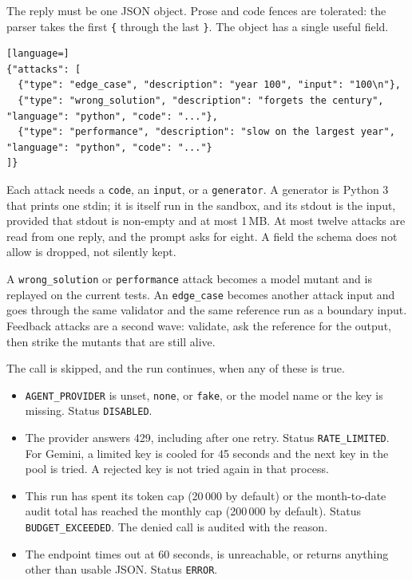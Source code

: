 \documentclass[10pt,a4paper]{article}
\begin{document}
The reply must be one JSON object. Prose and code fences are tolerated: the parser takes the first \texttt{\{} through the last \texttt{\}}. The object has a single useful field.

\begin{lstlisting}[language=]
{"attacks": [
  {"type": "edge_case", "description": "year 100", "input": "100\n"},
  {"type": "wrong_solution", "description": "forgets the century", "language": "python", "code": "..."},
  {"type": "performance", "description": "slow on the largest year", "language": "python", "code": "..."}
]}
\end{lstlisting}

Each attack needs a \texttt{code}, an \texttt{input}, or a \texttt{generator}. A generator is Python 3 that prints one stdin; it is itself run in the sandbox, and its stdout is the input, provided that stdout is non-empty and at most 1\,MB. At most twelve attacks are read from one reply, and the prompt asks for eight. A field the schema does not allow is dropped, not silently kept.

A \texttt{wrong\_solution} or \texttt{performance} attack becomes a model mutant and is replayed on the current tests. An \texttt{edge\_case} becomes another attack input and goes through the same validator and the same reference run as a boundary input. Feedback attacks are a second wave: validate, ask the reference for the output, then strike the mutants that are still alive.

The call is skipped, and the run continues, when any of these is true.

\begin{itemize}
  \item \texttt{AGENT\_PROVIDER} is unset, \texttt{none}, or \texttt{fake}, or the model name or the key is missing. Status \texttt{DISABLED}.
  \item The provider answers 429, including after one retry. Status \texttt{RATE\_LIMITED}. For Gemini, a limited key is cooled for 45 seconds and the next key in the pool is tried. A rejected key is not tried again in that process.
  \item This run has spent its token cap (20\,000 by default) or the month-to-date audit total has reached the monthly cap (200\,000 by default). Status \texttt{BUDGET\_EXCEEDED}. The denied call is audited with the reason.
  \item The endpoint times out at 60 seconds, is unreachable, or returns anything other than usable JSON. Status \texttt{ERROR}.
\end{itemize}
\end{document}
